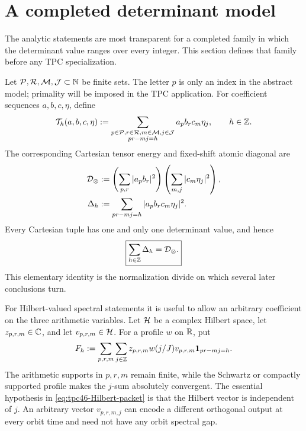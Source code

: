 \section{A completed determinant model}
\label{sec:tpc46-model}

The analytic statements are most transparent for a completed family in
which the determinant value ranges over every integer.  This section
defines that family before any TPC specialization.

Let
\(
 \mathcal P,\mathcal R,\mathcal M,\mathcal J\subset\mathbb N
\)
be finite sets.  The letter \(p\) is only an index in the abstract
model; primality will be imposed in the TPC application.  For
coefficient sequences \(a,b,c,\eta\), define
\begin{equation}
 \mathcal T_h(a,b,c,\eta)
 :=\sum_{\substack{p\in\mathcal P,r\in\mathcal R,m\in\mathcal M,j\in\mathcal J\\
                    pr-mj=h}}
 a_p b_r c_m\eta_j,
 \qquad h\in\mathbb Z.
 \label{eq:tpc46-scalar-packet}
\end{equation}
The corresponding Cartesian tensor energy and fixed-shift atomic
diagonal are
\begin{align}
 \mathcal D_\otimes
 &:=
 \left(\sum_{p,r}|a_pb_r|^2\right)
 \left(\sum_{m,j}|c_m\eta_j|^2\right),
 \label{eq:tpc46-tensor-energy}\\
 \Delta_h
 &:=
 \sum_{pr-mj=h}|a_pb_rc_m\eta_j|^2.
 \label{eq:tpc46-atomic-diagonal}
\end{align}
Every Cartesian tuple has one and only one determinant value, and hence
\begin{equation}
 \boxed{\sum_{h\in\mathbb Z}\Delta_h=\mathcal D_\otimes.}
 \label{eq:tpc46-diagonal-disintegration}
\end{equation}
This elementary identity is the normalization divide on which several
later conclusions turn.

For Hilbert-valued spectral statements it is useful to allow an
arbitrary coefficient on the three arithmetic variables.  Let
\(\mathcal H\) be a complex Hilbert space, let
\(z_{p,r,m}\in\mathbb C\), and let
\(v_{p,r,m}\in\mathcal H\).  For a profile \(w\) on \(\mathbb R\), put
\begin{equation}
 F_h
 :=\sum_{p,r,m}\sum_{j\in\mathbb Z}
 z_{p,r,m}w(j/J)v_{p,r,m}
 \mathbf 1_{pr-mj=h}.
 \label{eq:tpc46-Hilbert-packet}
\end{equation}
The arithmetic supports in \(p,r,m\) remain finite, while the Schwartz
or compactly supported profile makes the \(j\)-sum absolutely
convergent.  The essential hypothesis in
\eqref{eq:tpc46-Hilbert-packet} is that the Hilbert vector is independent
of \(j\).  An arbitrary vector \(v_{p,r,m,j}\) can encode a different
orthogonal output at every orbit time and need not have any orbit
spectral gap.


